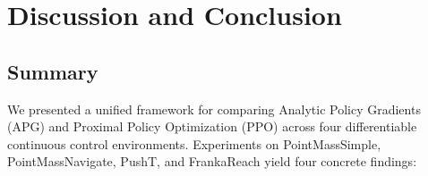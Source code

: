 \documentclass[11pt,a4paper]{article}
\begin{document}
\section{Discussion and Conclusion}
\label{sec:conclusion}

\subsection{Summary}
\label{sec:summary}

We presented a unified framework for comparing Analytic Policy Gradients (APG) and Proximal Policy Optimization (PPO) across four differentiable continuous control environments. Experiments on PointMassSimple, PointMassNavigate, PushT, and FrankaReach yield four concrete findings:
\end{document}
